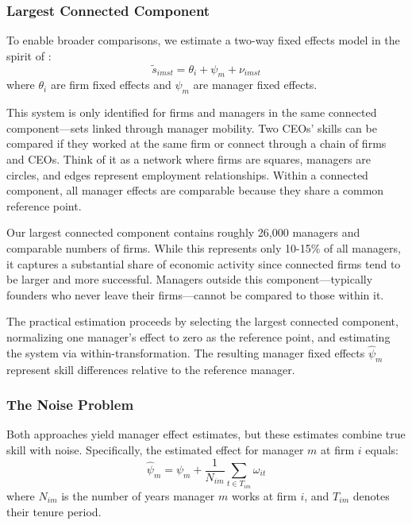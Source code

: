 \documentclass[11pt,a4paper]{article}
\begin{document}
\subsubsection{Largest Connected Component}

To enable broader comparisons, we estimate a two-way fixed effects model in the spirit of \citet{Abowd1999Econometrica}:
\begin{equation}
\tilde{s}_{imst} = \theta_i + \psi_m + \nu_{imst}
\end{equation}
where $\theta_i$ are firm fixed effects and $\psi_m$ are manager fixed effects.

This system is only identified for firms and managers in the same connected component—sets linked through manager mobility. Two CEOs' skills can be compared if they worked at the same firm or connect through a chain of firms and CEOs. Think of it as a network where firms are squares, managers are circles, and edges represent employment relationships. Within a connected component, all manager effects are comparable because they share a common reference point.

Our largest connected component contains roughly 26,000 managers and comparable numbers of firms. While this represents only 10-15\% of all managers, it captures a substantial share of economic activity since connected firms tend to be larger and more successful. Managers outside this component—typically founders who never leave their firms—cannot be compared to those within it.

The practical estimation proceeds by selecting the largest connected component, normalizing one manager's effect to zero as the reference point, and estimating the system via within-transformation. The resulting manager fixed effects $\hat{\psi}_m$ represent skill differences relative to the reference manager.

\subsubsection{The Noise Problem}

Both approaches yield manager effect estimates, but these estimates combine true skill with noise. Specifically, the estimated effect for manager $m$ at firm $i$ equals:
\begin{equation}
\hat{\psi}_m = \psi_m + \frac{1}{N_{im}} \sum_{t \in T_{im}} \omega_{it}
\end{equation}
where $N_{im}$ is the number of years manager $m$ works at firm $i$, and $T_{im}$ denotes their tenure period.
\end{document}
